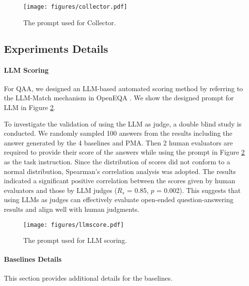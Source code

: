 \begin{figure}[!htb]
\centering
    \texttt{[image: figures/collector.pdf]}
\caption{The prompt used for Collector.}
\label{fig:prompt_collector}
\end{figure}


\subsection{Experiments Details}


\paragraph{LLM Scoring}
\label{metric}

For QAA, we designed an LLM-based automated scoring method by referring to the LLM-Match mechanism in OpenEQA \cite{majumdar2024openeqa}. We show the designed prompt for LLM in Figure \ref{fig:llmscore}.

To investigate the validation of using the LLM as judge, a double blind study is conducted. We randomly sampled 100 answers from the results including the answer generated by the 4 baselines and PMA. Then 2 human evaluators are required to provide their score of the answers while using the prompt in Figure \ref{fig:llmscore} as the task instruction. Since the distribution of scores did not conform to a normal distribution, Spearman's correlation analysis was adopted. The results indicated a significant positive correlation between the scores given by human evaluators and those by LLM judges ($R_s$ = 0.85, $p$ = 0.002). This suggests that using LLMs as judges can effectively evaluate open-ended question-answering results and align well with human judgments.


\begin{figure}[!htb]
\centering
    \texttt{[image: figures/llmscore.pdf]}
\caption{The prompt used for LLM scoring.}
\label{fig:llmscore}
\end{figure}

\paragraph{Baselines Details}

This section provides additional details for the baselines.

